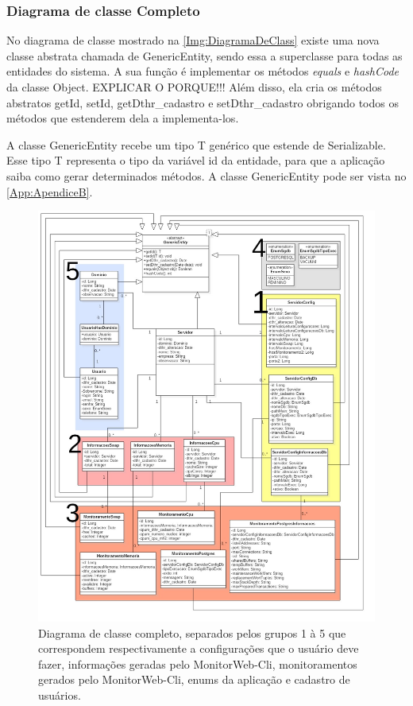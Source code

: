 \subsubsection{Diagrama de classe Completo}

No diagrama de classe mostrado na \autoref{Img:DiagramaDeClass} existe uma nova classe abstrata chamada de GenericEntity, sendo essa a superclasse para todas as entidades do sistema. A sua função é implementar os métodos \textit{equals} e \textit{hashCode} da classe Object. EXPLICAR O PORQUE!!! Além disso, ela cria os métodos abstratos getId, setId, getDthr\_cadastro e setDthr\_cadastro obrigando todos os métodos que estenderem dela a implementa-los.

A classe GenericEntity recebe um tipo T genérico que estende de Serializable. Esse tipo T representa o tipo da variável id da entidade, para que a aplicação saiba como gerar determinados métodos. A classe GenericEntity pode ser vista no \autoref{App:ApendiceB}.



\begin{figure}[H]
	\centering
	\includegraphics[width=1.0\textwidth]{figuras/DiagramaDeClass.jpg}
	\caption[Diagrama de classe completo.]{Diagrama de classe completo, separados pelos grupos 1 à 5 que correspondem respectivamente a configurações que o usuário deve fazer, informações geradas pelo MonitorWeb-Cli, monitoramentos gerados pelo MonitorWeb-Cli, enums da aplicação e cadastro de usuários.}
	\label{Img:DiagramaDeClass}
\end{figure}

